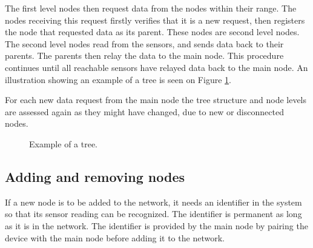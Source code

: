 The first level nodes then request data from the nodes within their range. 
The nodes receiving this request firstly verifies that it is a new request, then registers the node that requested data as its parent. 
These nodes are second level nodes. The second level nodes read from the sensors, and sends data back to their parents. The parents then relay the data to the main node. 
This procedure continues until all reachable sensors have relayed data back to the main node.
An illustration showing an example of a tree is seen on Figure \ref{fig:prottree1}.

For each new data request from the main node the tree structure and node levels are assessed again as they might have changed, due to new or disconnected nodes.

\begin{figure}[!h]
	\centering
	\caption{Example of a tree.}
	\label{fig:prottree1}
\end{figure}

\subsection{Adding and removing nodes}
If a new node is to be added to the network, it needs an identifier in the system so that its sensor reading can be recognized. The identifier is permanent as long as it is in the network.
The identifier is provided by the main node by pairing the device with the main node before adding it to the network. 

